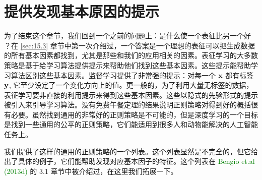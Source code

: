 
\section{提供发现基本原因的提示}
\label{sec:15.6}
为了结束这个章节，我们回到一个之前的问题上：是什么使一个表征比另一个好 ？在 \ref{sec:15.3} 章节中第一次介绍过，一个答案是一个理想的表征可以把生成数据的所有基本因素都找到，尤其是那些和我们的应用相关的因素。表征学习的大多数策略是基于给学习算法提供提示来帮助他们找到这些基本因素。这些提示能帮助学习算法区别这些基本因素。监督学习提供了非常强的提示：对每一个 $\bf x$ 都有标签 $\bf y$, 它至少设定了一个变化方向上的值。更一般的，为了利用大量无标签的数据，表征学习要非直接的利用提示来得到这些基本因素。这些以隐式的先验形式的提示被引入来引导学习算法。没有免费午餐定理的结果说明正则策略对得到好的概括很有必要。虽然找到通用的非常好的正则策略是不可能的，但是深度学习的一个目标是找到一些通用的公平的正则策略，它们能适用到很多人和动物能解决的人工智能任务上。

我们提供了这样的通用的正则策略的一个列表。这个列表显然是不完全的，但它给出了具体的例子，它们能帮助发现对应基本因子的特征。这个列表在 \textcolor{green}{Bengio et.al (2013d)} 的 3.1 章节中被介绍过，在这里我们拓展一下。

